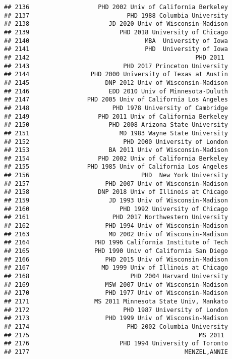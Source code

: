 \documentclass[
]{article}
\begin{document}
\begin{verbatim}
## 2136                   PHD 2002 Univ of California Berkeley
## 2137                           PHD 1988 Columbia University
## 2138                      JD 2020 Univ of Wisconsin-Madison
## 2139                         PHD 2018 University of Chicago
## 2140                                MBA  University of Iowa
## 2141                                PHD  University of Iowa
## 2142                                              PHD 2011 
## 2143                          PHD 2017 Princeton University
## 2144                 PHD 2000 University of Texas at Austin
## 2145                     DNP 2012 Univ of Wisconsin-Madison
## 2146                      EDD 2010 Univ of Minnesota-Duluth
## 2147                PHD 2005 Univ of California Los Angeles
## 2148                       PHD 1978 University of Cambridge
## 2149                   PHD 2011 Univ of California Berkeley
## 2150                      PHD 2008 Arizona State University
## 2151                         MD 1983 Wayne State University
## 2152                          PHD 2000 University of London
## 2153                      BA 2011 Univ of Wisconsin-Madison
## 2154                   PHD 2002 Univ of California Berkeley
## 2155                PHD 1985 Univ of California Los Angeles
## 2156                               PHD  New York University
## 2157                     PHD 2007 Univ of Wisconsin-Madison
## 2158                   DNP 2018 Univ of Illinois at Chicago
## 2159                      JD 1993 Univ of Wisconsin-Madison
## 2160                         PHD 1992 University of Chicago
## 2161                       PHD 2017 Northwestern University
## 2162                     PHD 1994 Univ of Wisconsin-Madison
## 2163                      MD 2002 Univ of Wisconsin-Madison
## 2164                  PHD 1996 California Institute of Tech
## 2165                  PHD 1990 Univ of California San Diego
## 2166                     PHD 2015 Univ of Wisconsin-Madison
## 2167                    MD 1999 Univ of Illinois at Chicago
## 2168                            PHD 2004 Harvard University
## 2169                     MSW 2007 Univ of Wisconsin-Madison
## 2170                     PHD 1977 Univ of Wisconsin-Madison
## 2171                  MS 2011 Minnesota State Univ, Mankato
## 2172                          PHD 1987 University of London
## 2173                     PHD 1999 Univ of Wisconsin-Madison
## 2174                           PHD 2002 Columbia University
## 2175                                               MS 2011 
## 2176                         PHD 1994 University of Toronto
## 2177                                           MENZEL,ANNIE

\end{verbatim}
\end{document}
